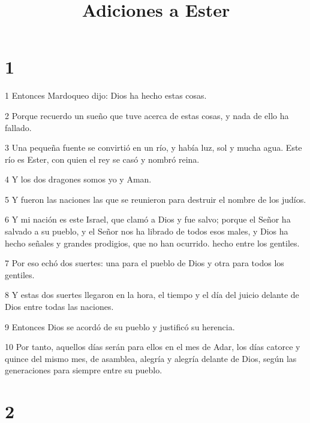 

\title{Adiciones a Ester}

\chapter{1}

\par 1 Entonces Mardoqueo dijo: Dios ha hecho estas cosas.
\par 2 Porque recuerdo un sueño que tuve acerca de estas cosas, y nada de ello ha fallado.
\par 3 Una pequeña fuente se convirtió en un río, y había luz, sol y mucha agua. Este río es Ester, con quien el rey se casó y nombró reina.
\par 4 Y los dos dragones somos yo y Aman.
\par 5 Y fueron las naciones las que se reunieron para destruir el nombre de los judíos.
\par 6 Y mi nación es este Israel, que clamó a Dios y fue salvo; porque el Señor ha salvado a su pueblo, y el Señor nos ha librado de todos esos males, y Dios ha hecho señales y grandes prodigios, que no han ocurrido. hecho entre los gentiles.
\par 7 Por eso echó dos suertes: una para el pueblo de Dios y otra para todos los gentiles.
\par 8 Y estas dos suertes llegaron en la hora, el tiempo y el día del juicio delante de Dios entre todas las naciones.
\par 9 Entonces Dios se acordó de su pueblo y justificó su herencia.
\par 10 Por tanto, aquellos días serán para ellos en el mes de Adar, los días catorce y quince del mismo mes, de asamblea, alegría y alegría delante de Dios, según las generaciones para siempre entre su pueblo.

\chapter{2}

